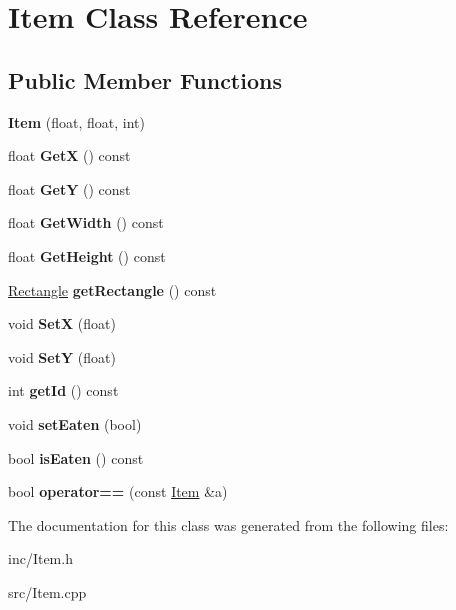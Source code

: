 \hypertarget{class_item}{}\section{Item Class Reference}
\label{class_item}
\subsection*{Public Member Functions}
\begin{DoxyCompactItemize}
\item 
\mbox{\label{class_item_a1f6b981457e0c5cd2107714a931639c0}} 
{\bfseries Item} (float, float, int)
\item 
\mbox{\label{class_item_ab992ef4ecbdbff86ce08aa292bd16dca}} 
float {\bfseries GetX} () const
\item 
\mbox{\label{class_item_a4dc52dee202e00a759c014e54c1a2ca8}} 
float {\bfseries GetY} () const
\item 
\mbox{\label{class_item_ae388116f5fb0421e35a81b42d6447653}} 
float {\bfseries Get\+Width} () const
\item 
\mbox{\label{class_item_aa48fa3065ccc915f25287a4d3f60b21b}} 
float {\bfseries Get\+Height} () const
\item 
\mbox{\label{class_item_afb6aa02e27f8cee1f9e49d948ade579a}} 
\hyperlink{class_rectangle}{Rectangle} {\bfseries get\+Rectangle} () const
\item 
\mbox{\label{class_item_a586d989ee355d45f2b41ba839896810c}} 
void {\bfseries SetX} (float)
\item 
\mbox{\label{class_item_a914a5b81ae9f9dcf547963d96cbb2a81}} 
void {\bfseries SetY} (float)
\item 
\mbox{\label{class_item_a74b41f137200eea8fcdeb26bba0a332b}} 
int {\bfseries get\+Id} () const
\item 
\mbox{\label{class_item_acb43cbe6e00b421e09610ca68f0377d6}} 
void {\bfseries set\+Eaten} (bool)
\item 
\mbox{\label{class_item_a7c6f1720c4274f7bcf52539cb37eeb14}} 
bool {\bfseries is\+Eaten} () const
\item 
\mbox{\label{class_item_a04c90ed8caf208566986dd781ec36a3e}} 
bool {\bfseries operator==} (const \hyperlink{class_item}{Item} \&a)
\end{DoxyCompactItemize}


The documentation for this class was generated from the following files\+:\begin{DoxyCompactItemize}
\item 
inc/Item.\+h\item 
src/Item.\+cpp\end{DoxyCompactItemize}
